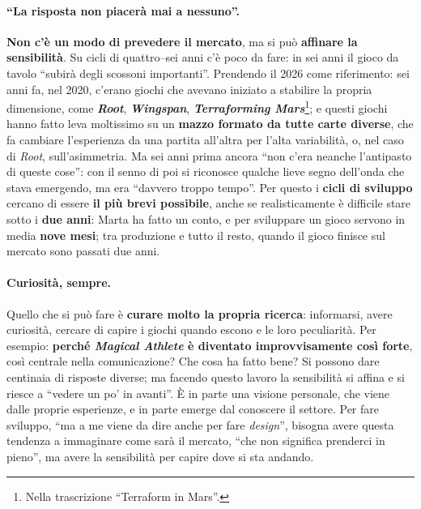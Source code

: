 \paragraph{``La risposta non piacerà mai a nessuno''.} \textbf{Non c'è un modo di prevedere
il mercato}, ma si può \textbf{affinare la sensibilità}. Su cicli di quattro--sei anni c'è
poco da fare: in sei anni il gioco da tavolo ``subirà degli scossoni importanti''. Prendendo
il 2026 come riferimento: sei anni fa, nel 2020, c'erano giochi che avevano iniziato a
stabilire la propria dimensione, come \textbf{\emph{Root}}, \textbf{\emph{Wingspan}},
\textbf{\emph{Terraforming Mars}}\footnote{Nella trascrizione ``Terraform in Mars''.}; e
questi giochi hanno fatto leva moltissimo su un \textbf{mazzo formato da tutte carte
diverse}, che fa cambiare l'esperienza da una partita all'altra per l'alta variabilità, o,
nel caso di \emph{Root}, sull'asimmetria. Ma sei anni prima ancora ``non c'era neanche
l'antipasto di queste cose'': con il senno di poi si riconosce qualche lieve segno dell'onda
che stava emergendo, ma era ``davvero troppo tempo''. Per questo i \textbf{cicli di
sviluppo} cercano di essere \textbf{il più brevi possibile}, anche se realisticamente è
difficile stare sotto i \textbf{due anni}: Marta ha fatto un conto, e per sviluppare un
gioco servono in media \textbf{nove mesi}; tra produzione e tutto il resto, quando il
gioco finisce sul mercato sono passati due anni.

\paragraph{Curiosità, sempre.} Quello che si può fare è \textbf{curare molto la propria
ricerca}: informarsi, avere curiosità, cercare di capire i giochi quando escono e le loro
peculiarità. Per esempio: \textbf{perché \emph{Magical Athlete} è diventato
improvvisamente così forte}, così centrale nella comunicazione? Che cosa ha fatto bene?
Si possono dare centinaia di risposte diverse; ma facendo questo lavoro la sensibilità si
affina e si riesce a ``vedere un po' in avanti''. È in parte una visione personale, che
viene dalle proprie esperienze, e in parte emerge dal conoscere il settore. Per fare
sviluppo, ``ma a me viene da dire anche per fare \emph{design}'', bisogna avere questa
tendenza a immaginare come sarà il mercato, ``che non significa prenderci in pieno'', ma
avere la sensibilità per capire dove si sta andando.

